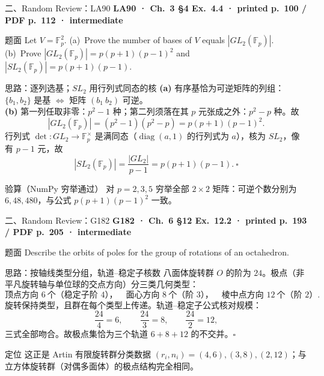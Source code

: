 \documentclass[aspectratio=169,10pt,fontset=none]{ctexbeamer}
\newcommand{\ex}[1]{\textcolor{accent}{\footnotesize\bfseries #1}}
\begin{document}
\begin{frame}[t]{二、Random Review：LA90}
  \leavevmode\ex{LA90 · Ch.~3 §4 Ex.~4.4 · printed p.~100 / PDF p.~112 · intermediate}
  \begin{block}{\footnotesize 题面}
    \scriptsize Let $V=\mathbb F_p^2$. (a)~Prove the number of bases of $V$ equals $|GL_2(\mathbb F_p)|$. (b)~Prove $|GL_2(\mathbb F_p)|=p(p+1)(p-1)^2$ and $|SL_2(\mathbb F_p)|=p(p+1)(p-1)$.
  \end{block}
  \begin{exampleblock}{\footnotesize 思路：逐列选基；$SL_2$ 用行列式同态的核}
    \scriptsize
    \textbf{(a)} 有序基恰为可逆矩阵的列组：$\{b_1,b_2\}$ 是基 $\Leftrightarrow$ 矩阵 $(b_1\ b_2)$ 可逆。\\[2pt]
    \textbf{(b)} 第一列任取非零：$p^2-1$ 种；第二列须落在其 $p$ 元张成之外：$p^2-p$ 种。故
    $$|GL_2(\mathbb F_p)|=(p^2-1)(p^2-p)=p(p+1)(p-1)^2.$$
    行列式 $\det:GL_2\to\mathbb F_p^\times$ 是满同态（$\operatorname{diag}(a,1)$ 的行列式为 $a$），核为 $SL_2$，像有 $p-1$ 元，故
    $$|SL_2(\mathbb F_p)|=\frac{|GL_2|}{p-1}=p(p+1)(p-1).\ \square$$
  \end{exampleblock}
  \begin{block}{\footnotesize 验算（NumPy 穷举通过）}
    \scriptsize 对 $p=2,3,5$ 穷举全部 $2\times2$ 矩阵：可逆个数分别为 $6,48,480$，与公式 $p(p+1)(p-1)^2$ 一致。
  \end{block}
\end{frame}

\begin{frame}[t]{二、Random Review：G182}
  \leavevmode\ex{G182 · Ch.~6 §12 Ex.~12.2 · printed p.~193 / PDF p.~205 · intermediate}
  \begin{block}{\footnotesize 题面}
    \scriptsize Describe the orbits of poles for the group of rotations of an octahedron.
  \end{block}
  \begin{exampleblock}{\footnotesize 思路：按轴线类型分组，轨道--稳定子核数}
    \scriptsize
    八面体旋转群 $O$ 的阶为 $24$。极点（非平凡旋转轴与单位球的交点方向）分三类几何类型：
    $$\text{顶点方向 }6\ \text{个（稳定子阶 }4\text{），}\quad \text{面心方向 }8\ \text{个（阶 }3\text{），}\quad \text{棱中点方向 }12\ \text{个（阶 }2\text{）}.$$
    旋转保持类型，且群在每个类型上传递。轨道--稳定子公式核对规模：
    $$\frac{24}{4}=6,\qquad \frac{24}{3}=8,\qquad \frac{24}{2}=12,$$
    三式全部吻合。故极点集恰为三个轨道 $6+8+12$ 的不交并。$\square$
  \end{exampleblock}
  \begin{block}{\footnotesize 定位}
    \scriptsize 这正是 Artin 有限旋转群分类数据 $(r_i,n_i)=(4,6),(3,8),(2,12)$；与立方体旋转群（对偶多面体）的极点结构完全相同。
  \end{block}
\end{frame}
\end{document}
